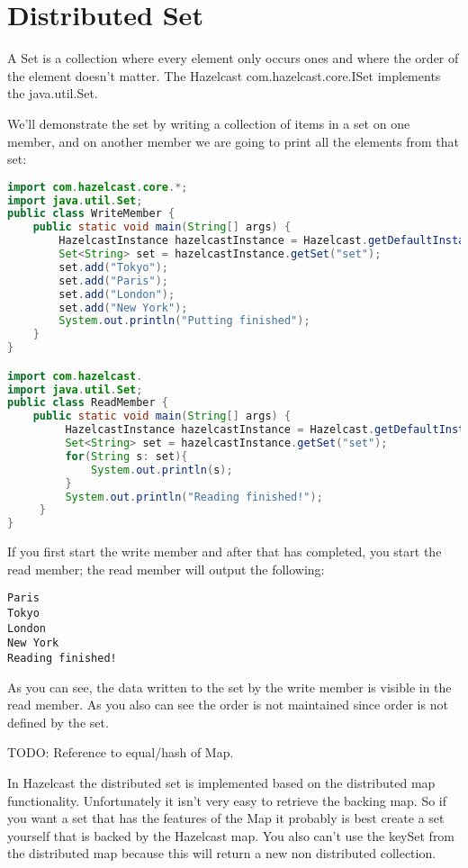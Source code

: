 \section{Distributed Set}
A Set is a collection where every element only occurs ones and where the order of the element doesn't matter. The Hazelcast com.hazelcast.core.ISet implements the java.util.Set.

We'll demonstrate the set by writing a collection of items in a set on one member, and on another member we are going to print all the elements from that set:
\begin{lstlisting}[language=java]
import com.hazelcast.core.*;
import java.util.Set;
public class WriteMember {
    public static void main(String[] args) {
        HazelcastInstance hazelcastInstance = Hazelcast.getDefaultInstance();
        Set<String> set = hazelcastInstance.getSet("set");
        set.add("Tokyo");
        set.add("Paris");
        set.add("London");
        set.add("New York");
        System.out.println("Putting finished");
    }
}

import com.hazelcast.
import java.util.Set;
public class ReadMember {
    public static void main(String[] args) {
         HazelcastInstance hazelcastInstance = Hazelcast.getDefaultInstance();
         Set<String> set = hazelcastInstance.getSet("set");
         for(String s: set){
             System.out.println(s);
         }
         System.out.println("Reading finished!");
     }
}

\end{lstlisting}

If you first start the write member and after that has completed, you start the read member; the read member will output the following:
\begin{verbatim}
Paris
Tokyo
London
New York
Reading finished!	
\end{verbatim}
As you can see, the data written to the set by the write member is visible in the read member. As you also can see the order is not maintained since order is not defined by the set.

TODO: Reference to equal/hash of Map.

In Hazelcast the distributed set is implemented based on the distributed map functionality. Unfortunately it isn't very easy to retrieve the backing map. So if you want a set that has the features of the Map it probably is best create a set yourself that is backed by the Hazelcast map. You also can't use the keySet from the distributed map because this will return a new non distributed collection. 

